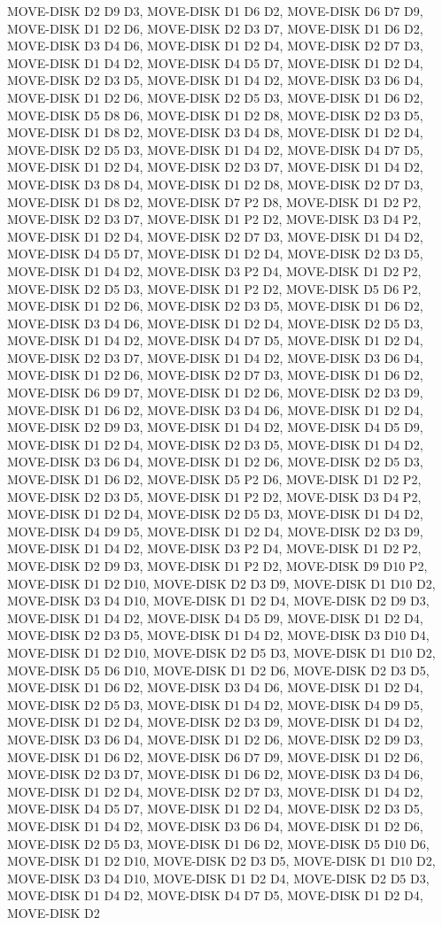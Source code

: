 \documentclass[12pt]{article}
\begin{document}
\begin{appendix}
\begin{itemize}
MOVE-DISK D2 D9 D3,  MOVE-DISK D1 D6 D2,  MOVE-DISK D6 D7 D9,  MOVE-DISK D1 D2 D6,  MOVE-DISK D2 D3 D7,  MOVE-DISK D1 D6 D2,  MOVE-DISK D3 D4 D6,  MOVE-DISK D1 D2 D4,  MOVE-DISK D2 D7 D3,  MOVE-DISK D1 D4 D2,  MOVE-DISK D4 D5 D7,  MOVE-DISK D1 D2 D4,  MOVE-DISK D2 D3 D5,  MOVE-DISK D1 D4 D2,  MOVE-DISK D3 D6 D4,  MOVE-DISK D1 D2 D6,  MOVE-DISK D2 D5 D3,  MOVE-DISK D1 D6 D2,  MOVE-DISK D5 D8 D6,  MOVE-DISK D1 D2 D8,  MOVE-DISK D2 D3 D5,  MOVE-DISK D1 D8 D2,  MOVE-DISK D3 D4 D8,  MOVE-DISK D1 D2 D4,  MOVE-DISK D2 D5 D3,  MOVE-DISK D1 D4 D2,  MOVE-DISK D4 D7 D5,  MOVE-DISK D1 D2 D4,  MOVE-DISK D2 D3 D7,  MOVE-DISK D1 D4 D2,  MOVE-DISK D3 D8 D4,  MOVE-DISK D1 D2 D8,  MOVE-DISK D2 D7 D3,  MOVE-DISK D1 D8 D2,  MOVE-DISK D7 P2 D8,  MOVE-DISK D1 D2 P2,  MOVE-DISK D2 D3 D7,  MOVE-DISK D1 P2 D2,  MOVE-DISK D3 D4 P2,  MOVE-DISK D1 D2 D4,  MOVE-DISK D2 D7 D3,  MOVE-DISK D1 D4 D2,  MOVE-DISK D4 D5 D7,  MOVE-DISK D1 D2 D4,  MOVE-DISK D2 D3 D5,  MOVE-DISK D1 D4 D2,  MOVE-DISK D3 P2 D4,  MOVE-DISK D1 D2 P2,  MOVE-DISK D2 D5 D3,  MOVE-DISK D1 P2 D2,  MOVE-DISK D5 D6 P2,  MOVE-DISK D1 D2 D6,  MOVE-DISK D2 D3 D5,  MOVE-DISK D1 D6 D2,  MOVE-DISK D3 D4 D6,  MOVE-DISK D1 D2 D4,  MOVE-DISK D2 D5 D3,  MOVE-DISK D1 D4 D2,  MOVE-DISK D4 D7 D5,  MOVE-DISK D1 D2 D4,  MOVE-DISK D2 D3 D7,  MOVE-DISK D1 D4 D2,  MOVE-DISK D3 D6 D4,  MOVE-DISK D1 D2 D6,  MOVE-DISK D2 D7 D3,  MOVE-DISK D1 D6 D2,  MOVE-DISK D6 D9 D7,  MOVE-DISK D1 D2 D6,  MOVE-DISK D2 D3 D9,  MOVE-DISK D1 D6 D2,  MOVE-DISK D3 D4 D6,  MOVE-DISK D1 D2 D4,  MOVE-DISK D2 D9 D3,  MOVE-DISK D1 D4 D2,  MOVE-DISK D4 D5 D9,  MOVE-DISK D1 D2 D4,  MOVE-DISK D2 D3 D5,  MOVE-DISK D1 D4 D2,  MOVE-DISK D3 D6 D4,  MOVE-DISK D1 D2 D6,  MOVE-DISK D2 D5 D3,  MOVE-DISK D1 D6 D2,  MOVE-DISK D5 P2 D6,  MOVE-DISK D1 D2 P2,  MOVE-DISK D2 D3 D5,  MOVE-DISK D1 P2 D2,  MOVE-DISK D3 D4 P2,  MOVE-DISK D1 D2 D4,  MOVE-DISK D2 D5 D3,  MOVE-DISK D1 D4 D2,  MOVE-DISK D4 D9 D5,  MOVE-DISK D1 D2 D4,  MOVE-DISK D2 D3 D9,  MOVE-DISK D1 D4 D2,  MOVE-DISK D3 P2 D4,  MOVE-DISK D1 D2 P2,  MOVE-DISK D2 D9 D3,  MOVE-DISK D1 P2 D2,  MOVE-DISK D9 D10 P2,  MOVE-DISK D1 D2 D10,  MOVE-DISK D2 D3 D9,  MOVE-DISK D1 D10 D2,  MOVE-DISK D3 D4 D10,  MOVE-DISK D1 D2 D4,  MOVE-DISK D2 D9 D3,  MOVE-DISK D1 D4 D2,  MOVE-DISK D4 D5 D9,  MOVE-DISK D1 D2 D4,  MOVE-DISK D2 D3 D5,  MOVE-DISK D1 D4 D2,  MOVE-DISK D3 D10 D4,  MOVE-DISK D1 D2 D10,  MOVE-DISK D2 D5 D3,  MOVE-DISK D1 D10 D2,  MOVE-DISK D5 D6 D10,  MOVE-DISK D1 D2 D6,  MOVE-DISK D2 D3 D5,  MOVE-DISK D1 D6 D2,  MOVE-DISK D3 D4 D6,  MOVE-DISK D1 D2 D4,  MOVE-DISK D2 D5 D3,  MOVE-DISK D1 D4 D2,  MOVE-DISK D4 D9 D5,  MOVE-DISK D1 D2 D4,  MOVE-DISK D2 D3 D9,  MOVE-DISK D1 D4 D2,  MOVE-DISK D3 D6 D4,  MOVE-DISK D1 D2 D6,  MOVE-DISK D2 D9 D3,  MOVE-DISK D1 D6 D2,  MOVE-DISK D6 D7 D9,  MOVE-DISK D1 D2 D6,  MOVE-DISK D2 D3 D7,  MOVE-DISK D1 D6 D2,  MOVE-DISK D3 D4 D6,  MOVE-DISK D1 D2 D4,  MOVE-DISK D2 D7 D3,  MOVE-DISK D1 D4 D2,  MOVE-DISK D4 D5 D7,  MOVE-DISK D1 D2 D4,  MOVE-DISK D2 D3 D5,  MOVE-DISK D1 D4 D2,  MOVE-DISK D3 D6 D4,  MOVE-DISK D1 D2 D6,  MOVE-DISK D2 D5 D3,  MOVE-DISK D1 D6 D2,  MOVE-DISK D5 D10 D6,  MOVE-DISK D1 D2 D10,  MOVE-DISK D2 D3 D5,  MOVE-DISK D1 D10 D2,  MOVE-DISK D3 D4 D10,  MOVE-DISK D1 D2 D4,  MOVE-DISK D2 D5 D3,  MOVE-DISK D1 D4 D2,  MOVE-DISK D4 D7 D5,  MOVE-DISK D1 D2 D4,  MOVE-DISK D2 
\end{itemize}
\end{appendix}
\end{document}
